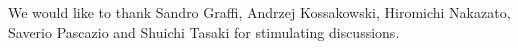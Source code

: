 \documentclass[aip,jmp,12pt
]{revtex4}
\theoremstyle{definition}
\begin{document}
%
\acknowledgments
We would  like to thank Sandro Graffi,
Andrzej Kossakowski, Hiromichi Nakazato, Saverio Pascazio and Shuichi Tasaki  for stimulating
discussions.
%
% 
% 
%
\end{document}
